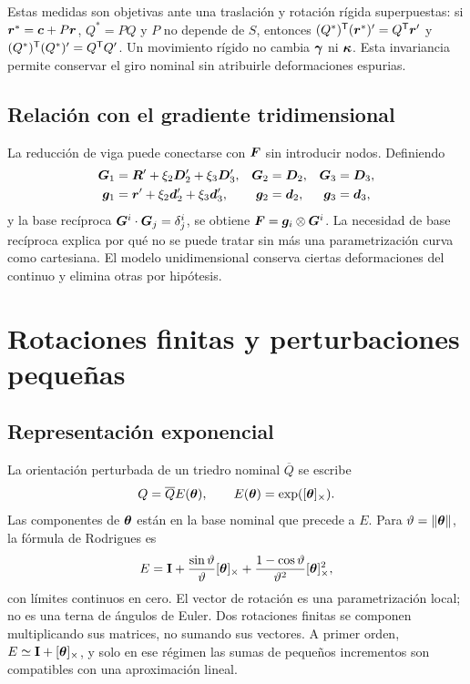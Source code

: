 Estas medidas son objetivas ante una traslación y rotación rígida superpuestas: si $\bm{r}^*=\bm{c}+P\bm{r}$, $Q^*=PQ$ y $P$ no depende de $S$, entonces $(Q^*)^\mathsf T(\bm{r}^*)'=Q^\mathsf T\bm{r}'$ y $(Q^*)^\mathsf T(Q^*)'=Q^\mathsf T Q'$. Un movimiento rígido no cambia $\bm{\gamma}$ ni $\bm{\kappa}$. Esta invariancia permite conservar el giro nominal sin atribuirle deformaciones espurias.

\subsection{Relación con el gradiente tridimensional}
La reducción de viga puede conectarse con $\boldsymbol{F}$ sin introducir nodos. Definiendo
\begin{align}
 \bm{G}_1&=\bm{R}'+\xi_2\bm{D}_2'+\xi_3\bm{D}_3',&
 \bm{G}_2&=\bm{D}_2,&\bm{G}_3&=\bm{D}_3,\\
 \bm{g}_1&=\bm{r}'+\xi_2\bm{d}_2'+\xi_3\bm{d}_3',&
 \bm{g}_2&=\bm{d}_2,&\bm{g}_3&=\bm{d}_3,
\end{align}
y la base recíproca $\bm{G}^i\cdot\bm{G}_j=\delta^i_j$, se obtiene $\boldsymbol{F}=\bm{g}_i\otimes\bm{G}^i$. La necesidad de base recíproca explica por qué no se puede tratar sin más una parametrización curva como cartesiana. El modelo unidimensional conserva ciertas deformaciones del continuo y elimina otras por hipótesis.

\section{Rotaciones finitas y perturbaciones pequeñas}
\subsection{Representación exponencial}
La orientación perturbada de un triedro nominal $\overline Q$ se escribe
\begin{equation}
 Q=\overline Q E(\bm{\theta}),\qquad E(\bm{\theta})=\exp([\bm{\theta}]_{\times}).
 \label{eq:exprot}
\end{equation}
Las componentes de $\bm{\theta}$ están en la base nominal que precede a $E$. Para $\vartheta=\|\bm{\theta}\|$, la fórmula de Rodrigues es
\begin{equation}
 E=\mathbf I+\frac{\sin\vartheta}{\vartheta}[\bm{\theta}]_{\times}
 +\frac{1-\cos\vartheta}{\vartheta^2}[\bm{\theta}]_{\times}^2,
\end{equation}
con límites continuos en cero. El vector de rotación es una parametrización local; no es una terna de ángulos de Euler. Dos rotaciones finitas se componen multiplicando sus matrices, no sumando sus vectores. A primer orden, $E\simeq\mathbf I+[\bm{\theta}]_{\times}$, y solo en ese régimen las sumas de pequeños incrementos son compatibles con una aproximación lineal.

